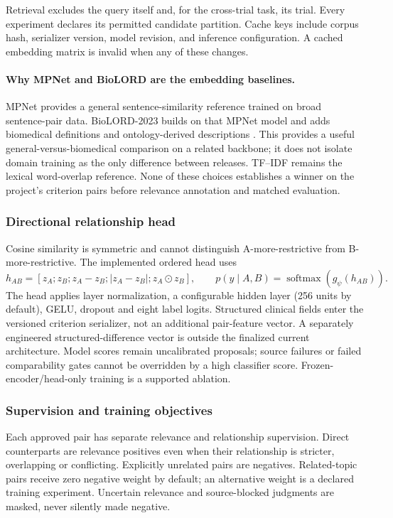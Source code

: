 \documentclass[10pt,letterpaper]{article}
\begin{document}
Retrieval excludes the query itself and, for the cross-trial task, its trial.
Every experiment declares its permitted candidate partition. Cache keys
include corpus hash, serializer version, model revision, and inference
configuration. A cached embedding matrix is invalid when any of these changes.

\paragraph{Why MPNet and BioLORD are the embedding baselines.}
MPNet provides a general sentence-similarity reference trained on broad
sentence-pair data. BioLORD-2023 builds on that MPNet model and adds biomedical
definitions and ontology-derived descriptions \cite{mpnet,biolord}. This
provides a useful general-versus-biomedical comparison on a related backbone;
it does not isolate domain training as the only difference between releases.
TF--IDF remains the lexical word-overlap reference. None of these choices
establishes a winner on the project's criterion pairs before relevance
annotation and matched evaluation.

\subsubsection{Directional relationship head}
Cosine similarity is symmetric and cannot distinguish A-more-restrictive
from B-more-restrictive. The implemented ordered head uses
\[
 h_{AB}=[z_A;z_B;z_A-z_B;|z_A-z_B|;z_A\odot z_B],\qquad
 p(y\mid A,B)=\operatorname{softmax}(g_{\psi}(h_{AB})).
\]
The head applies layer normalization, a configurable hidden layer (256 units
by default), GELU, dropout and eight label logits. Structured clinical fields
enter the versioned criterion serializer, not an additional pair-feature
vector. A separately engineered structured-difference vector is outside the
finalized current architecture. Model scores remain uncalibrated proposals;
source failures or failed comparability gates cannot be overridden by a high
classifier score. Frozen-encoder/head-only training is a supported ablation.

\subsubsection{Supervision and training objectives}
Each approved pair has separate relevance and relationship supervision.
Direct counterparts are relevance positives even when their relationship is
stricter, overlapping or conflicting. Explicitly unrelated pairs are negatives.
Related-topic pairs receive zero negative weight by default; an alternative
weight is a declared training experiment. Uncertain relevance and
source-blocked judgments are masked, never silently made negative.
\end{document}
